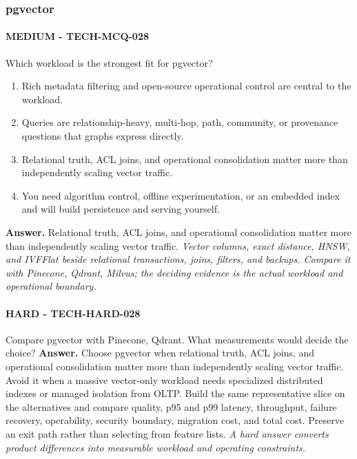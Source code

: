 \subsubsection*{pgvector}
\paragraph{MEDIUM - TECH-MCQ-028} Which workload is the strongest fit for pgvector?
\begin{enumerate}[label=\Alph*.]
\item Rich metadata filtering and open-source operational control are central to the workload.
\item Queries are relationship-heavy, multi-hop, path, community, or provenance questions that graphs express directly.
\item Relational truth, ACL joins, and operational consolidation matter more than independently scaling vector traffic.
\item You need algorithm control, offline experimentation, or an embedded index and will build persistence and serving yourself.
\end{enumerate}
\textbf{Answer.} Relational truth, ACL joins, and operational consolidation matter more than independently scaling vector traffic.
\textit{Vector columns, exact distance, HNSW, and IVFFlat beside relational transactions, joins, filters, and backups. Compare it with Pinecone, Qdrant, Milvus; the deciding evidence is the actual workload and operational boundary.}
\paragraph{HARD - TECH-HARD-028} Compare pgvector with Pinecone, Qdrant. What measurements would decide the choice?
\textbf{Answer.} Choose pgvector when relational truth, ACL joins, and operational consolidation matter more than independently scaling vector traffic. Avoid it when a massive vector-only workload needs specialized distributed indexes or managed isolation from OLTP. Build the same representative slice on the alternatives and compare quality, p95 and p99 latency, throughput, failure recovery, operability, security boundary, migration cost, and total cost. Preserve an exit path rather than selecting from feature lists.
\textit{A hard answer converts product differences into measurable workload and operating constraints.}
